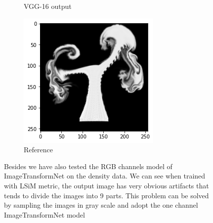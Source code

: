 \documentclass[a4paper,12pt,twoside]{report}
\begin{document}
\begin{figure}
\begin{subfigure}{0.32\textwidth}
		\caption{VGG-16 output}
	\end{subfigure}
	\begin{subfigure}{0.32\textwidth}
		\centering
		\includegraphics[scale=0.5]{superresolution/checkerboard_ref.png}
		\caption{Reference}
	\end{subfigure}
	\caption{Besides we have also tested the RGB channels model of ImageTransformNet on the density data. We can see when trained with LSiM metric, the output image has very obvious artifacts that tends to divide the images into 9 parts. This problem can be solved by sampling the images in gray scale and adopt the one channel ImageTransformNet model}
\end{figure}
\end{document}
